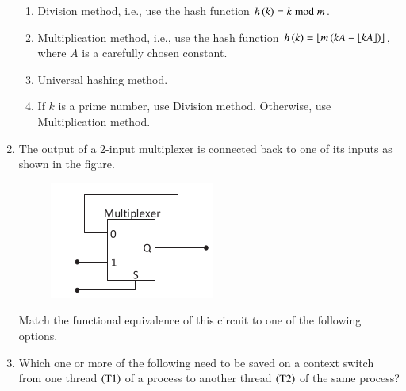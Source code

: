 \documentclass[journal,12pt,onecolumn]{IEEEtran}
\theoremstyle{remark}
\begin{document}
\begin{enumerate}
\hfill{}
		
		\begin{enumerate}
	
				\item Division method, i.e., use the hash function $h\left(k\right) = k \bmod m$.
				\item Multiplication method, i.e., use the hash function $h\left(k\right) = \lfloor m\left(kA - \lfloor kA \rfloor\right)\rfloor$, where $A$ is a carefully chosen constant.
				\item Universal hashing method.
				\item If $k$ is a prime number, use Division method. Otherwise, use Multiplication method.

		\end{enumerate}
		
		\item The output of a $2$-input multiplexer is connected back to one of its inputs as shown in the figure.
		\begin{figure}[H]
			\centering
			\includegraphics[width=0.3\linewidth]{figs/screenshot002}
			\caption{}
			\label{fig:screenshot002}
		\end{figure}
		
		Match the functional equivalence of this circuit to one of the following options.
		
\hfill{}
		
		\begin{enumerate}
		\end{enumerate}
		
		\item Which one or more of the following need to be saved on a context switch from one thread $\left(\text{T1}\right)$ of a process to another thread $\left(\text{T2}\right)$ of the same process?
		

\end{enumerate}
\end{document}

